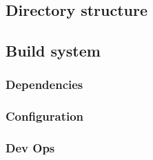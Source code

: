 \subsection{Directory structure}

\begin{description}[font=\tt\textpluscolon]
\item[lib]
\item[lib/t]
\item[src]
\end{description}


\subsection{Build system}


\subsubsection{Dependencies}


\subsubsection{Configuration}


\subsubsection{Dev Ops}

